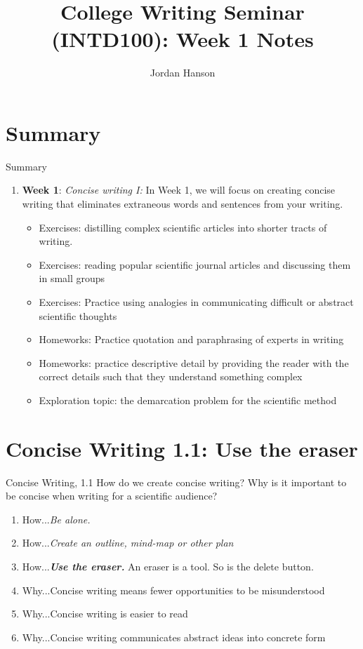 \documentclass{beamer}
\title{College Writing Seminar (INTD100): Week 1 Notes}
\author{Jordan Hanson}
\institute{Whittier College Department of Physics and Astronomy}
\begin{document}
\maketitle

\section{Summary}

\begin{frame}{Summary}
\begin{enumerate}
\item \textbf{Week 1}: \textit{Concise writing I:} In Week 1, we will focus on creating concise writing that eliminates extraneous words and sentences from your writing.
\begin{itemize}
\item Exercises: distilling complex scientific articles into shorter tracts of writing.
\item Exercises: reading popular scientific journal articles and discussing them in small groups
\item Exercises: Practice using analogies in communicating difficult or abstract scientific thoughts
\item Homeworks: Practice quotation and paraphrasing of experts in writing
\item Homeworks: practice descriptive detail by providing the reader with the correct details such that they understand something complex
\item Exploration topic: the demarcation problem for the scientific method
\end{itemize}
\end{enumerate}
\end{frame}

\section{Concise Writing 1.1: Use the eraser}

\begin{frame}{Concise Writing, 1.1}
\small
How do we create concise writing?  Why is it important to be concise when writing for a scientific audience?
\begin{enumerate}
\item How...\textit{Be alone.}
\item How...\textit{Create an outline, mind-map or other plan}
\item How...\textit{\textbf{Use the eraser.}}  An eraser is a tool.  So is the delete button.
\item Why...Concise writing means fewer opportunities to be misunderstood
\item Why...Concise writing is easier to read
\item Why...Concise writing communicates abstract ideas into concrete form
\end{enumerate}
\end{frame}
\end{document}
